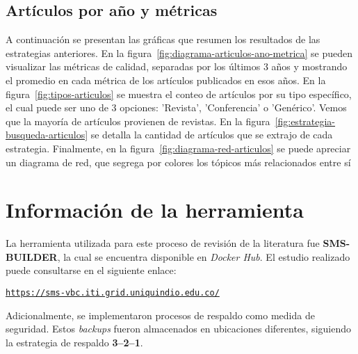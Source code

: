 \subsection{Artículos por año y métricas}
A continuación se presentan las gráficas que resumen los resultados de las estrategias anteriores. En la figura~\ref{fig:diagrama-articulos-ano-metrica} se pueden visualizar las métricas de calidad, separadas por los últimos 3 años y mostrando el promedio en cada métrica de los artículos publicados en esos años. En la figura~\ref{fig:tipos-articulos} se muestra el conteo de artículos por su tipo específico, el cual puede ser uno de 3 opciones: 'Revista', 'Conferencia' o 'Genérico'. Vemos que la mayoría de artículos provienen de revistas. En la figura~\ref{fig:estrategia-busqueda-articulos} se detalla la cantidad de artículos que se extrajo de cada estrategia. Finalmente, en la figura~\ref{fig:diagrama-red-articulos} se puede apreciar un diagrama de red, que segrega por colores los tópicos más relacionados entre sí


\section{Información de la herramienta}

\noindent
La herramienta utilizada para este proceso de revisión de la literatura fue \textbf{SMS-BUILDER}, la cual se encuentra disponible en \textit{Docker Hub}. El estudio realizado puede consultarse en el siguiente enlace:

\begin{center}
\href{https://sms-vbc.iti.grid.uniquindio.edu.co/}{\texttt{https://sms-vbc.iti.grid.uniquindio.edu.co/}}
\end{center}

\noindent
Adicionalmente, se implementaron procesos de respaldo como medida de seguridad. Estos \textit{backups} fueron almacenados en ubicaciones diferentes, siguiendo la estrategia de respaldo \textbf{3--2--1}.
